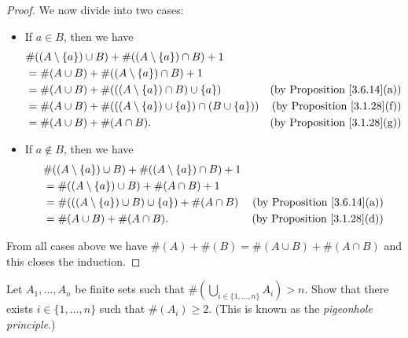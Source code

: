 \begin{proof}
    We now divide into two cases:
    \begin{itemize}
        \item If \(a \in B\), then we have
              \begin{align*}
                   & \#((A \setminus \{a\}) \cup B) + \#((A \setminus \{a\}) \cap B) + 1                                                 \\
                   & = \#(A \cup B) + \#((A \setminus \{a\}) \cap B) + 1                                                                 \\
                   & = \#(A \cup B) + \#(((A \setminus \{a\}) \cap B) \cup \{a\})              & \text{(by Proposition \ref{3.6.14}(a))} \\
                   & = \#(A \cup B) + \#(((A \setminus \{a\}) \cup \{a\}) \cap (B \cup \{a\})) & \text{(by Proposition \ref{3.1.28}(f))} \\
                   & = \#(A \cup B) + \#(A \cap B).                                            & \text{(by Proposition \ref{3.1.28}(g))}
              \end{align*}
        \item If \(a \notin B\), then we have
              \begin{align*}
                   & \#((A \setminus \{a\}) \cup B) + \#((A \setminus \{a\}) \cap B) + 1                                           \\
                   & = \#((A \setminus \{a\}) \cup B) + \#(A \cap B) + 1                                                           \\
                   & = \#(((A \setminus \{a\}) \cup B) \cup \{a\}) + \#(A \cap B)        & \text{(by Proposition \ref{3.6.14}(a))} \\
                   & = \#(A \cup B) + \#(A \cap B).                                      & \text{(by Proposition \ref{3.1.28}(d))}
              \end{align*}
    \end{itemize}
    From all cases above we have \(\#(A) + \#(B) = \#(A \cup B) + \#(A \cap B)\) and this closes the induction.
\end{proof}

\begin{exercise}\label{ex 3.6.10}
    Let \(A_1, \dots, A_n\) be finite sets such that \(\#(\bigcup_{i \in \{1, \dots, n\}} A_i) > n\).
    Show that there exists \(i \in \{1, \dots, n\}\) such that \(\#(A_i) \geq 2\).
    (This is known as the \emph{pigeonhole principle}.)
\end{exercise}

